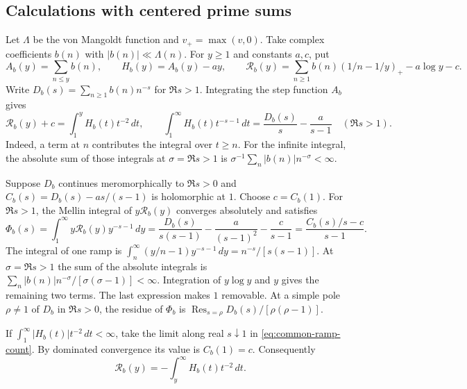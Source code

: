 \subsection*{Calculations with centered prime sums}

%
Let \(\Lambda\) be the von Mangoldt function and \(v_+=\max(v,0)\).
Take complex coefficients \(b(n)\) with \(|b(n)|\ll\Lambda(n)\).
For \(y\ge1\) and constants \(a,c\), put
\[
 A_b(y)=\sum_{n\le y}b(n),\qquad H_b(y)=A_b(y)-ay,\qquad
 \mathcal R_b(y)=\sum_{n\ge1}b(n)(1/n-1/y)_+-a\log y-c .
\]
Write \(D_b(s)=\sum_{n\ge1}b(n)n^{-s}\) for \(\Re s>1\).
Integrating the step function \(A_b\) gives
\begin{equation}\label{eq:common-ramp-count}
 \mathcal R_b(y)+c=\int_1^y H_b(t)t^{-2}\,dt,\qquad
 \int_1^\infty H_b(t)t^{-s-1}\,dt
   =\frac{D_b(s)}s-\frac{a}{s-1}\quad(\Re s>1).
\end{equation}
Indeed, a term at \(n\) contributes the integral over \(t\ge n\).
For the infinite integral, the absolute sum of those integrals at
\(\sigma=\Re s>1\) is \(\sigma^{-1}\sum_n |b(n)|n^{-\sigma}<\infty\).

%
Suppose \(D_b\) continues meromorphically to \(\Re s>0\) and
\(C_b(s)=D_b(s)-as/(s-1)\) is holomorphic at \(1\).
Choose \(c=C_b(1)\). For \(\Re s>1\), the Mellin integral of
\(y\mathcal R_b(y)\) converges absolutely and satisfies
\begin{equation}\label{eq:common-ramp-mellin}
 \Phi_b(s)=\int_1^\infty y\mathcal R_b(y)y^{-s-1}\,dy
 =\frac{D_b(s)}{s(s-1)}-\frac{a}{(s-1)^2}-\frac{c}{s-1}
 =\frac{C_b(s)/s-c}{s-1}.
\end{equation}
The integral of one ramp is
\(\int_n^\infty (y/n-1)y^{-s-1}\,dy=n^{-s}/[s(s-1)]\).
At \(\sigma=\Re s>1\) the sum of the absolute integrals is
\(\sum_n |b(n)|n^{-\sigma}/[\sigma(\sigma-1)]<\infty\).
Integration of \(y\log y\) and \(y\) gives the remaining two terms.
The last expression makes \(1\) removable. At a simple pole
\(\rho\ne1\) of \(D_b\) in \(\Re s>0\), the residue of \(\Phi_b\) is
\(\operatorname{Res}_{s=\rho}D_b(s)/[\rho(\rho-1)]\).

If \(\int_1^\infty |H_b(t)|t^{-2}\,dt<\infty\), take the limit
along real \(s\downarrow1\) in \eqref{eq:common-ramp-count}.
By dominated convergence its value is \(C_b(1)=c\). Consequently
\begin{equation}\label{eq:common-ramp-tail}
 \mathcal R_b(y)=-\int_y^\infty H_b(t)t^{-2}\,dt .
\end{equation}

